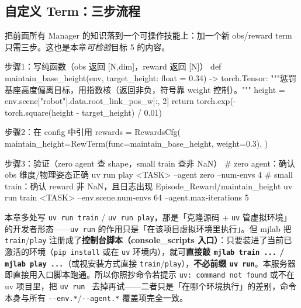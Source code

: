 \subsection{自定义 Term：三步流程}
\label{sec:rlmc-mgr-customterm}

把前面所有 Manager 的知识落到一个可操作技能上：加一个新 obs/reward term 只需三步。这也是本章\emph{可检验}目标 5 的内容。

\begin{codebox}[Python]{步骤1：写纯函数（obs 返回 [N,dim]，reward 返回 [N]）}
def maintain_base_height(env, target_height: float = 0.34) -> torch.Tensor:
    """惩罚基座高度偏离目标，用指数核（返回非负，符号靠 weight 控制）。"""
    height = env.scene["robot"].data.root_link_pos_w[:, 2]
    return torch.exp(-torch.square(height - target_height) / 0.01)
\end{codebox}

\begin{codebox}[Python]{步骤2：在 config 中引用}
rewards = RewardsCfg(
    maintain_height=RewTerm(func=maintain_base_height, weight=0.3),
)
\end{codebox}

\begin{codebox}[bash]{步骤3：验证（zero agent 查 shape，small train 查非 NaN）}
# zero agent：确认 obs 维度/物理姿态正确
uv run play <TASK> --agent zero --num-envs 4
# small train：确认 reward 非 NaN，且日志出现 Episode_Reward/maintain_height
uv run train <TASK> --env.scene.num-envs 64 --agent.max-iterations 5
\end{codebox}


\begin{note}
本章多处写 \verb|uv run train| / \verb|uv run play|，那是「克隆源码 + \texttt{uv} 管虚拟环境」的开发者形态——\verb|uv run| 的作用只是「在该项目虚拟环境里执行」。但 mjlab 把 \verb|train|/\verb|play| 注册成了\textbf{控制台脚本（console\_scripts 入口）}：只要装进了当前已激活的环境（\verb|pip install| 或在 \verb|uv| 环境内），就可\textbf{直接敲 \texttt{mjlab train ...} / \texttt{mjlab play ...}}（或视安装方式直接 \verb|train|/\verb|play|），\textbf{不必前缀 \texttt{uv run}}。本服务器即直接用入口脚本跑通。所以你照抄命令若提示 \verb|uv: command not found| 或不在 uv 项目里，把 \verb|uv run | 去掉再试——二者只是「在哪个环境执行」的差别，命令本身与所有 \verb|--env.*|/\verb|--agent.*| 覆盖项完全一致。
\end{note}

